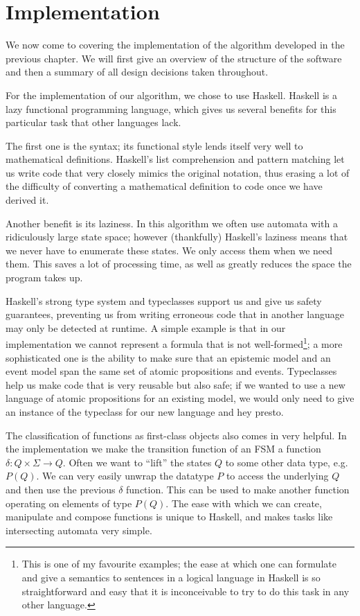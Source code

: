 \documentclass[10pt, a4paper]{report}
\begin{document}
\newpage 

\chapter{Implementation}

We now come to covering the implementation of the algorithm developed in the
previous chapter. We will first give an overview of the structure of the
software and then a summary of all design decisions taken throughout. 

For the implementation of our algorithm, we chose to use Haskell. Haskell is a
lazy functional programming language, which gives us several benefits for this
particular task that other languages lack. 

The first one is the syntax; its functional style lends itself very well to
mathematical definitions. Haskell's list comprehension and pattern matching let us
write code that very closely mimics the original notation, thus erasing a lot of
the difficulty of converting a mathematical definition to code once we have
derived it. 

Another benefit is its laziness. In this algorithm we often use automata
with a ridiculously large state space; however (thankfully) Haskell's laziness
means that we never have to enumerate these states. We only access them when we
need them. This saves a lot of processing time, as well as greatly reduces the
space the program takes up.

Haskell's strong type system and typeclasses support us and give us safety
guarantees, preventing us from writing erroneous code that in another language
may only be detected at runtime. A simple example is that in our implementation
we cannot represent a formula that is not well-formed\footnote{This is one of my
  favourite examples; the ease at which one can formulate and give a semantics
  to sentences in a logical language in Haskell is so straightforward and easy
  that it is inconceivable to try to do this task in any other language.}; a more
sophisticated one is the ability to make sure that an epistemic model and an
event model span the same set of atomic propositions and events. Typeclasses
help us make code that is very reusable but also safe; if we wanted to use a new
language of atomic propositions for an existing model, we would only need to
give an instance of the  typeclass for our new language and hey
presto.

The classification of functions as first-class objects also comes in very
helpful. In the implementation we make the transition function of an FSM a
function $\delta : Q \times \Sigma \rightarrow Q$. Often we want to ``lift'' the
states $Q$ to some other data type, e.g. $P (Q)$. We can very easily unwrap the
datatype $P$ to access the underlying $Q$ and then use the previous $\delta$
function. This can be used to make another function operating on elements of
type $P (Q)$. The ease with which we can create, manipulate and compose
functions is unique to Haskell, and makes tasks like intersecting automata very
simple. 
\end{document}
